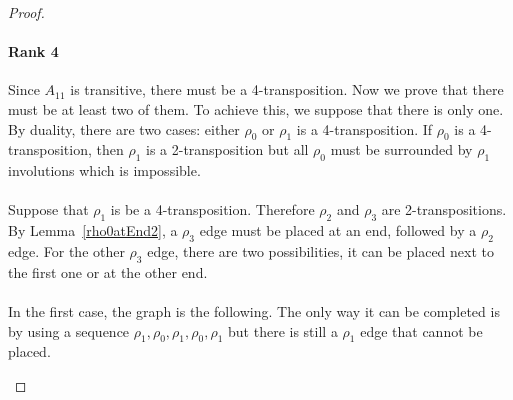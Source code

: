 \begin{proof}
  \paragraph{Rank 4}
  Since $A_{11}$ is transitive, there must be a 4-transposition. Now we prove that there must be at least two of them. To achieve this, we suppose that there is only one. By duality, there are two cases: either $\rho_0$ or $\rho_1$ is a 4-transposition. If $\rho_0$ is a 4-transposition, then $\rho_1$ is a 2-transposition but all $\rho_0$ must be surrounded by $\rho_1$ involutions which is impossible.

  \paragraph{}
  Suppose that $\rho_1$ is be a 4-transposition. Therefore $\rho_2$ and $\rho_3$ are 2-transpositions. By Lemma~\ref{rho0atEnd2}, a $\rho_3$ edge must be placed at an end, followed by a $\rho_2$ edge. For the other $\rho_3$ edge, there are two possibilities, it can be placed next to the first one or at the other end.

  \paragraph{}
  In the first case, the graph is the following. The only way it can be completed is by using a sequence $\rho_1, \rho_0, \rho_1, \rho_0, \rho_1$ but there is still a $\rho_1$ edge that cannot be placed.

  \begin{figure}[H]
    \begin{center}
\end{center}
\end{figure}
\end{proof}
